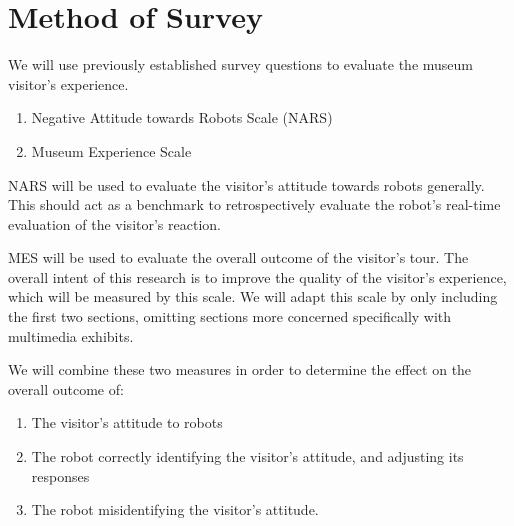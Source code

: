 
\section{Method of Survey}

We will use previously established survey questions to evaluate the museum visitor's experience.

\begin{enumerate}
    \item Negative Attitude towards Robots Scale (NARS)\cite{syrdal1}
    \item Museum Experience Scale\cite{othman1}
\end{enumerate}

NARS will be used to evaluate the visitor's attitude towards robots generally.  This should act as a benchmark to retrospectively evaluate the robot's real-time evaluation of the visitor's reaction.

MES will be used to evaluate the overall outcome of the visitor's tour.  The overall intent of this research is to improve the quality of the visitor's experience, which will be measured by this scale.  We will adapt this scale by only including the first two sections, omitting sections more concerned specifically with multimedia exhibits.

We will combine these two measures in order to determine the effect on the overall outcome of:

\begin{enumerate}
    \item The visitor's attitude to robots
    \item The robot correctly identifying the visitor's attitude, and adjusting its responses
    \item The robot misidentifying the visitor's attitude.
\end{enumerate}
